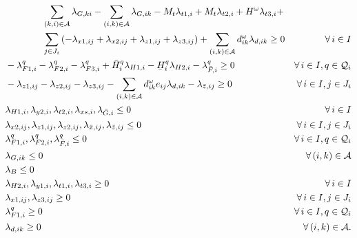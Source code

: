 \documentclass[11pt]{article}
\newcommand{\cA}{{\cal A}}
\newcommand{\cQ}{{\cal Q}}
\renewcommand{\underbar}{\underaccent{\bar}}
\begin{document}
\begin{subequations}
\begin{align}
		& \qquad \qquad \sum_{(k,i) \in \cA} \lambda_{G,ki} - \sum_{(i,k) \in \cA} \lambda_{G,ik} - M_t \lambda_{t1,i} + M_t \lambda_{t2,i} + H^\omega \lambda_{t3,i} + & \nonumber \\
		& \qquad \qquad \sum_{j \in J_i} \left(-\lambda_{x1,ij} + \lambda_{x2,ij} + \lambda_{z1,ij} + \lambda_{z3,ij} \right) + \sum_{(i,k) \in \cA} d_{ik}^\omega \lambda_{d,ik} \geq 0 & \forall\, i \in I \label{cons:dualG}\\
		&-\lambda_{F1,i}^q - \lambda_{F2,i}^q - \lambda_{F3,i}^q + \bar{H}_i^q \lambda_{H1,i} - \underbar{H}_i^q \lambda_{H2,i} - \lambda_{\bar{F},i}^q \geq 0 & \forall \, i \in I, q \in \cQ_i \label{cons:dualF}\\
		&-\lambda_{z1,ij} - \lambda_{z2,ij} - \lambda_{z3,ij} - \sum_{(i,k) \in \cA} d_{ik}^\omega e_{ij} \lambda_{d,ik} - \lambda_{\bar{z},ij} \geq 0 & \forall \, i \in I, j \in J_i \label{cons:dualz}\\
		& \lambda_{H1,i},\lambda_{y2,i},\lambda_{t2,i}, \lambda_{xs,i},\lambda_{\bar{G},i} \leq 0 & \forall\, i\in I \\
		& \lambda_{x2,ij}, \lambda_{z1,ij}, \lambda_{z2,ij}, \lambda_{\bar{x},ij}, \lambda_{\bar{z},ij} \leq 0 & \forall\, i \in I, j \in J_i \\
		& \lambda_{F1,i}^q,\lambda_{F2,i}^q,\lambda_{\bar{F},i}^q \leq 0 & \forall\, i \in I, q \in \cQ_i\\
		& \lambda_{G,ik} \leq 0 & \forall\, (i,k) \in \cA \\
		& \lambda_B \leq 0 &\\
		& \lambda_{H2,i},\lambda_{y1,i},\lambda_{t1,i},\lambda_{t3,i} \geq 0 & \forall\, i\in I \\
		& \lambda_{x1,ij}, \lambda_{z3,ij} \geq 0 & \forall\, i \in I, j \in J_i \\
		& \lambda_{F1,i}^q \geq 0 & \forall\, i \in I, q \in \cQ_i\\
		& \lambda_{d,ik} \geq 0 & \forall\, (i,k) \in \cA .
		\end{align}
	\end{subequations}
	
\end{document}
